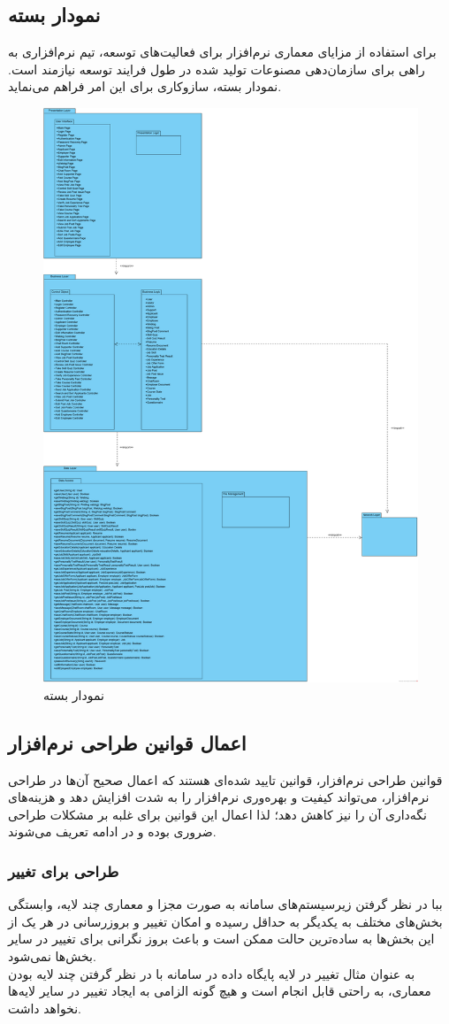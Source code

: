 \documentclass[12pt]{article}
\begin{document}
	\subsection{نمودار بسته}
	برای استفاده از مزایای معماری نرم‌افزار برای فعالیت‌های توسعه، تیم نرم‌افزاری به راهی برای سازمان‌دهی مصنوعات تولید شده در طول فرایند توسعه نیازمند است. نمودار بسته، سازوکاری برای این امر فراهم می‌نماید.
	\begin{figure}[H]
		\centering
		\includegraphics[width=0.5\linewidth]{files/Project_OOAD_Phase2_PackageDiagram}
		\caption{نمودار بسته}
		\label{fig:packagediagram}
	\end{figure}

	\subsection{اعمال قوانین طراحی نرم‌افزار}
قوانین طراحی نرم‌افزار، قوانین تایید شده‌ای هستند که اعمال صحیح آن‌ها در طراحی نرم‌افزار، می‌تواند کیفیت و بهره‌وری نرم‌افزار را به شدت افزایش دهد و هزینه‌های نگه‌داری آن را نیز کاهش دهد؛ لذا اعمال این قوانین برای غلبه بر مشکلات طراحی ضروری بوده و در ادامه تعریف می‌شوند.
	\subsubsection{طراحی برای تغییر}
	ببا در نظر گرفتن زیرسیستم‌های سامانه به صورت مجزا و معماری چند لایه، وابستگی بخش‌های مختلف به یکدیگر به حداقل رسیده و امکان تغییر و بروزرسانی در هر یک از این بخش‌ها به ساده‌ترین حالت ممكن است و باعث بروز نگرانی برای تغییر در سایر بخش‌ها نمی‌شود.\\
	به عنوان مثال تغییر در لایه پایگاه داده در سامانه با در نظر گرفتن چند لایه بودن معماری، به راحتی قابل انجام است و هیچ گونه الزامی به ایجاد تغییر در سایر لایه‌ها نخواهد داشت.
\end{document}
